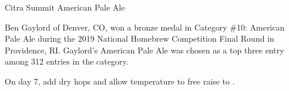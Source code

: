 \begin{recipie}{Citra Summit American Pale Ale}

\begin{aboutblock}
Ben Gaylord of Denver, CO, won a bronze medal in Category \#10: American Pale Ale
during the 2019 National Homebrew Competition Final Round in Providence, RI.
Gaylord's American Pale Ale was chosen as a top three entry among 312 entries in
the category. \sourceaha
\end{aboutblock}


\begin{methodandtiming}
 
\begin{mashsteps}
\end{mashsteps}

\begin{fermentationsteps}
\end{fermentationsteps}

\begin{directions}
On day 7, add dry hops and allow temperature to free raise to .
\end{directions}

\end{methodandtiming}

\pagebreak

\begin{ingredientsblock}

\begin{malts}
\end{malts}

\begin{hops}
\end{hops}


\end{ingredientsblock}

\end{recipie}

